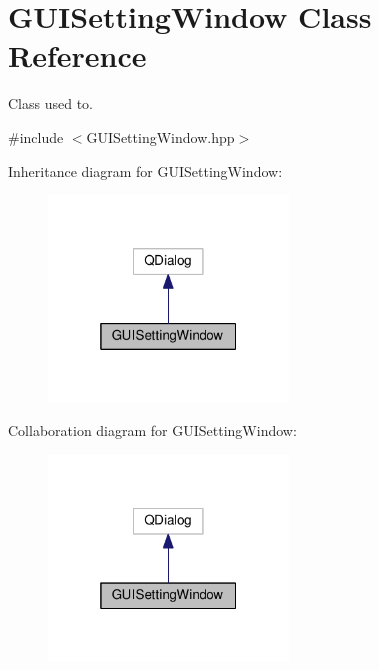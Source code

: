 \hypertarget{class_g_u_i_setting_window}{}\section{G\+U\+I\+Setting\+Window Class Reference}
\label{class_g_u_i_setting_window}


Class used to.  




{\ttfamily \#include $<$G\+U\+I\+Setting\+Window.\+hpp$>$}



Inheritance diagram for G\+U\+I\+Setting\+Window\+:
\nopagebreak
\begin{figure}[H]
\begin{center}
\leavevmode
\includegraphics[width=181pt]{class_g_u_i_setting_window__inherit__graph}
\end{center}
\end{figure}


Collaboration diagram for G\+U\+I\+Setting\+Window\+:
\nopagebreak
\begin{figure}[H]
\begin{center}
\leavevmode
\includegraphics[width=181pt]{class_g_u_i_setting_window__coll__graph}
\end{center}
\end{figure}
